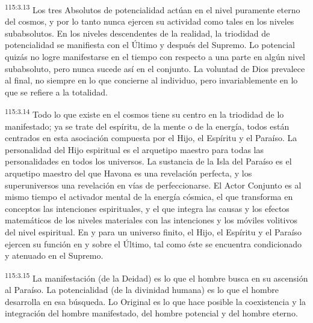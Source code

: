 \documentclass[twoside, 11pt]{book}
\begin{document}
\par
\textsuperscript{115:3.13} Los tres Absolutos de potencialidad actúan en el nivel puramente eterno del cosmos, y por lo tanto nunca ejercen su actividad como tales en los niveles subabsolutos. En los niveles descendentes de la realidad, la triodidad de potencialidad se manifiesta con el Último y después del Supremo. Lo potencial quizás no logre manifestarse en el tiempo con respecto a una parte en algún nivel subabsoluto, pero nunca sucede así en el conjunto. La voluntad de Dios prevalece al final, no siempre en lo que concierne al individuo, pero invariablemente en lo que se refiere a la totalidad.

\par
\textsuperscript{115:3.14} Todo lo que existe en el cosmos tiene su centro en la triodidad de lo manifestado; ya se trate del espíritu, de la mente o de la energía, todos están centrados en esta asociación compuesta por el Hijo, el Espíritu y el Paraíso. La personalidad del Hijo espiritual es el arquetipo maestro para todas las personalidades en todos los universos. La sustancia de la Isla del Paraíso es el arquetipo maestro del que Havona es una revelación perfecta, y los superuniversos una revelación en vías de perfeccionarse. El Actor Conjunto es al mismo tiempo el activador mental de la energía cósmica, el que transforma en conceptos las intenciones espirituales, y el que integra las causas y los efectos matemáticos de los niveles materiales con las intenciones y los móviles volitivos del nivel espiritual. En y para un universo finito, el Hijo, el Espíritu y el Paraíso ejercen su función en y sobre el Último, tal como éste se encuentra condicionado y atenuado en el Supremo.

\par
\textsuperscript{115:3.15} La manifestación (de la Deidad) es lo que el hombre busca en su ascensión al Paraíso. La potencialidad (de la divinidad humana) es lo que el hombre desarrolla en esa búsqueda. Lo Original es lo que hace posible la coexistencia y la integración del hombre manifestado, del hombre potencial y del hombre eterno.
\end{document}
